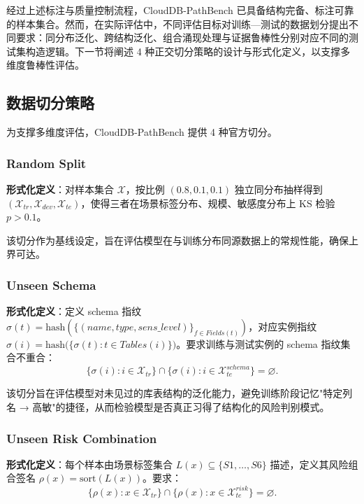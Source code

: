 \documentclass[a4paper,12pt]{ctexart}
\begin{document}
经过上述标注与质量控制流程，CloudDB-PathBench 已具备结构完备、标注可靠的样本集合。然而，在实际评估中，不同评估目标对训练—测试的数据划分提出不同要求：同分布泛化、跨结构泛化、组合涌现处理与证据鲁棒性分别对应不同的测试集构造逻辑。下一节将阐述 4 种正交切分策略的设计与形式化定义，以支撑多维度鲁棒性评估。

\subsection{数据切分策略}

为支撑多维度评估，CloudDB-PathBench 提供 4 种官方切分。

\subsubsection{Random Split}

\textbf{形式化定义}：对样本集合 $\mathcal{X}$，按比例 $(0.8, 0.1, 0.1)$ 独立同分布抽样得到 $(\mathcal{X}_{tr}, \mathcal{X}_{dev}, \mathcal{X}_{te})$，使得三者在场景标签分布、规模、敏感度分布上 KS 检验 $p > 0.1$。

该切分作为基线设定，旨在评估模型在与训练分布同源数据上的常规性能，确保上界可达。

\subsubsection{Unseen Schema}

\textbf{形式化定义}：定义 schema 指纹 $\sigma(t) = \mathrm{hash}(\{(name, type, sens\_level)\}_{f\in Fields(t)})$，对应实例指纹 $\sigma(i) = \mathrm{hash}\big(\{\sigma(t) : t \in Tables(i)\}\big)$。要求训练与测试实例的 schema 指纹集合不重合：
\[\{\sigma(i) : i \in \mathcal{X}_{tr}\} \cap \{\sigma(i) : i \in \mathcal{X}_{te}^{schema}\} = \varnothing.\]

该切分旨在评估模型对未见过的库表结构的泛化能力，避免训练阶段记忆"特定列名 → 高敏"的捷径，从而检验模型是否真正习得了结构化的风险判别模式。

\subsubsection{Unseen Risk Combination}

\textbf{形式化定义}：每个样本由场景标签集合 $L(x) \subseteq \{S1, \ldots, S6\}$ 描述，定义其风险组合签名 $\rho(x) = \mathrm{sort}(L(x))$。要求：
\[\{\rho(x) : x \in \mathcal{X}_{tr}\} \cap \{\rho(x) : x \in \mathcal{X}_{te}^{risk}\} = \varnothing.\]
\end{document}
